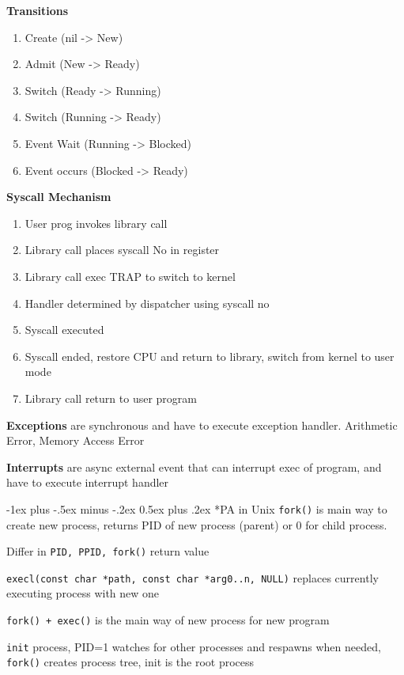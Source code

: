 \documentclass[10pt,landscape]{article}
\makeatletter
\renewcommand{\section}{\@startsection{section}{1}{0mm}%
  {-1ex plus -.5ex minus -.2ex}%
  {0.5ex plus .2ex}%
{\normalfont\large\bfseries}}
\makeatother
\begin{document}
\begin{multicols*}{4}
  \textbf{Transitions}
  \begin{enumerate}
    \item Create (nil -> New)
    \item Admit (New -> Ready)
    \item Switch (Ready -> Running)
    \item Switch (Running -> Ready)
    \item Event Wait (Running -> Blocked)
    \item Event occurs (Blocked -> Ready)
  \end{enumerate}

  \textbf{Syscall Mechanism}
  \begin{enumerate}
    \item User prog invokes library call
    \item Library call places syscall No in register
    \item Library call exec TRAP to switch to kernel
    \item Handler determined by dispatcher using syscall no
    \item Syscall executed
    \item Syscall ended, restore CPU and return to library, switch from kernel to user mode
    \item Library call return to user program
  \end{enumerate}

  \textbf{Exceptions} are synchronous and have to execute exception handler. Arithmetic Error, Memory Access Error

  \textbf{Interrupts} are async external event that can interrupt exec of program, and have to execute interrupt handler

  \section*{PA in Unix}
  \texttt{fork()} is main way to create new process, returns PID of new process (parent) or 0 for child process.

  Differ in \texttt{PID, PPID, fork()} return value

  \texttt{execl(const char *path, const char *arg0..n, NULL)} replaces currently executing process with new one

  \texttt{fork() + exec()} is the main way of new process for new program

  \texttt{init} process, PID=1 watches for other processes and respawns when needed, \texttt{fork()} creates process tree, init is the root process


\end{multicols*}
\end{document}
